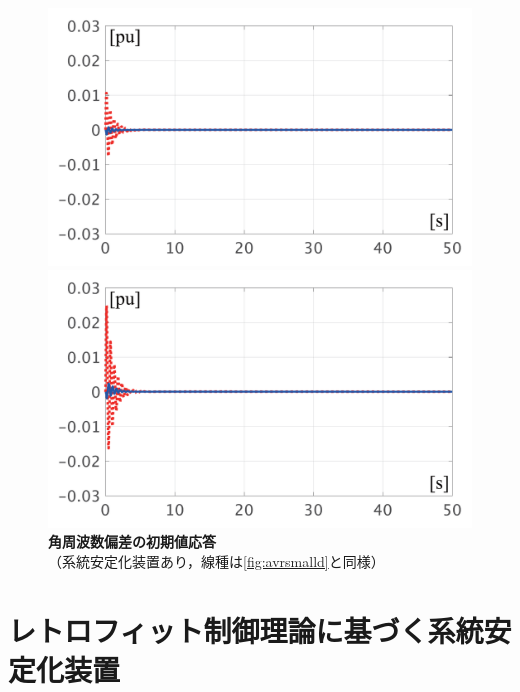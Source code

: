 \documentclass[tombow,dvipdfmx]{corona-a5-1.1}
\begin{document}
\begin{figure}[t]
  \centering
  {
  \begin{minipage}{0.49\linewidth}
    \centering
    \includegraphics[width = 1.0\linewidth]{figs/wPSSsmall}
  \end{minipage}
  \begin{minipage}{0.49\linewidth}
    \centering
    \includegraphics[width = 1.0\linewidth]{figs/wPSSlarge}
  \end{minipage}
  \medskip
  \caption{\textbf{角周波数偏差の初期値応答}
  \\ \centering（系統安定化装置あり，線種は\ref{fig:avrsmalld}と同様） }
  \label{fig:PSSomega}
  }
\medskip
\end{figure}

\section{レトロフィット制御理論に基づく系統安定化装置\advanced}\label{sec:retrofit}
\end{document}
